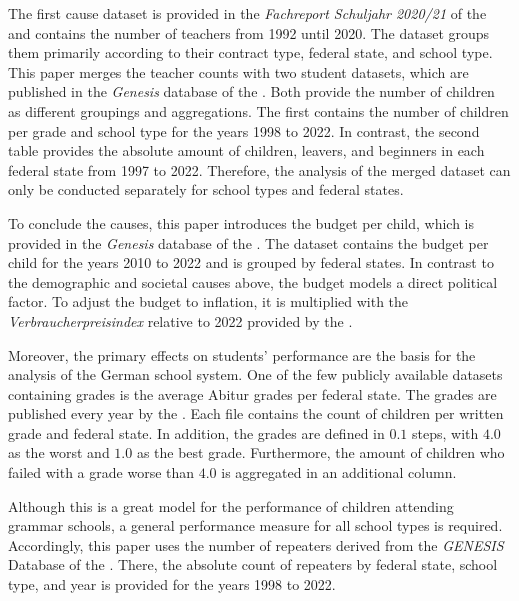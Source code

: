 The first cause dataset is provided in the \textit{Fachreport Schuljahr 2020/21} of the \citeauthor{statistische_bundesamt_allgemeinbildende_2022} and contains the number of teachers from 1992 until 2020. The dataset groups them primarily according to their contract type, federal state, and school type. This paper merges the teacher counts with two student datasets, which are published in the \textit{Genesis} database of the \citeauthor{statistische_bundesamt_statistisches_2023}. Both provide the number of children as different groupings and aggregations. The first contains the number of children per grade and school type  for the years 1998 to 2022. In contrast, the second table provides the absolute amount of children, leavers, and beginners in each federal state from 1997 to 2022. Therefore, the analysis of the merged dataset can only be conducted separately for school types and federal states.

To conclude the causes, this paper introduces the budget per child, which is provided in the \textit{Genesis} database of the \citeauthor{statistische_bundesamt_statistisches_2023}. The dataset contains the budget per child for the years 2010 to 2022 and is grouped by federal states. In contrast to the demographic and societal causes above, the budget models a direct political factor. To adjust the budget to inflation, it is multiplied with the \textit{Verbraucherpreisindex} relative to 2022 provided by the \citeauthor{statistische_bundesamt_statistisches_2023}. 


Moreover, the primary effects on students' performance are the basis for the analysis of the German school system. One of the few publicly available datasets containing grades is the average Abitur grades per federal state. The grades are published every year by the \citeauthor{kultusminister_konferenz_abiturnoten_nodate}. Each file contains the count of children per written grade and federal state. In addition, the grades are defined in $0.1$ steps, with $4.0$ as the worst and $1.0$ as the best grade. Furthermore, the amount of children who failed with a grade worse than $4.0$ is aggregated in an additional column. 

Although this is a great model for the performance of children attending grammar schools, a general performance measure for all school types is required. Accordingly, this paper uses the number of repeaters derived from the \textit{{GENESIS}} Database of the \citeauthor{statistische_bundesamt_statistisches_2023}. There, the absolute count of repeaters by federal state, school type, and year is provided for the years 1998 to 2022.

